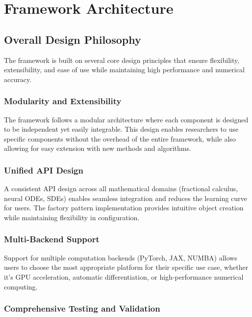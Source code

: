 \section{Framework Architecture}

\subsection{Overall Design Philosophy}

The \hpfracc framework is built on several core design principles that ensure flexibility, extensibility, and ease of use while maintaining high performance and numerical accuracy.

\subsubsection{Modularity and Extensibility}

The framework follows a modular architecture where each component is designed to be independent yet easily integrable. This design enables researchers to use specific components without the overhead of the entire framework, while also allowing for easy extension with new methods and algorithms.

\subsubsection{Unified API Design}

A consistent API design across all mathematical domains (fractional calculus, neural ODEs, SDEs) enables seamless integration and reduces the learning curve for users. The factory pattern implementation provides intuitive object creation while maintaining flexibility in configuration.

\subsubsection{Multi-Backend Support}

Support for multiple computation backends (PyTorch, JAX, NUMBA) allows users to choose the most appropriate platform for their specific use case, whether it's GPU acceleration, automatic differentiation, or high-performance numerical computing.

\subsubsection{Comprehensive Testing and Validation}

